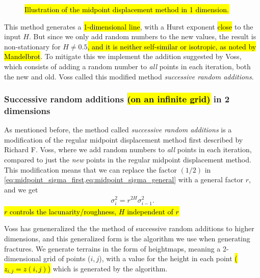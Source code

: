 \begin{figure}
    \centering
    
    \caption{
        \hl{Illustration of the midpoint displacement method in 1 dimension.}
        \label{fig:midpoint01}
    }
\end{figure}

This method generates a \hl{1-dimensional line}, with a Hurst exponent \hl{close} to the input $H$. But since we only add random numbers to the new values, the result is non-stationary for $H \neq 0.5$\cite{voss1985random}\hl{, and it is neither self-similar or isotropic, as noted by Mandelbrot}\cite{mandelbrot1982comment}. To mitigate this we implement the addition suggested by Voss\cite{voss1985random}, which consists of adding a random number to \emph{all} points in each iteration, both the new and old. Voss called this modified method \emph{successive random additions}.

\subsubsection{Successive random additions \hl{(on an infinite grid)} in 2 dimensions}

As mentioned before, the method called \emph{successive random additions} is a modification of the regular midpoint displacement method first described by Richard F. Voss\cite{voss1985random}, where we add random numbers to \emph{all} points in each iteration, compared to just the \emph{new} points in the regular midpoint displacement method. This modification means that we can replace the factor $(1/2)$ in \cref{eq:midpoint_sigma_first,eq:midpoint_sigma_general} with a general factor $r$, and we get
\begin{align*}
    \sigma_i^2 = r^{2H}\sigma^2_{i-1}.
\end{align*}
\hl{$r$ controls the lacunarity/roughness, $H$ independent of $r$}

Voss has geneneralized the the method of successive random additions to higher dimensions\cite{voss1985random}, and this generalized form is the algorithm we use when generating fractures. We generate terrains in the form of heightmaps, meaning a 2-dimensional grid of points ({$i,j$}), with a value for the height in each point \hl{($z_{i,j} = z(i,j)$)} which is generated by the algorithm.

